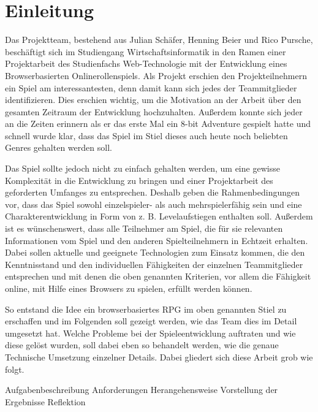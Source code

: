 

\section{Einleitung}

Das Projektteam, bestehend aus Julian Schäfer, Henning Beier und Rico Pursche, beschäftigt sich im Studiengang Wirtschaftsinformatik in den Ramen einer Projektarbeit des Studienfachs Web-Technologie mit der Entwicklung eines Browserbasierten Onlinerollenspiels. 
Als Projekt erschien den Projekteilnehmern ein Spiel am interessantesten, denn damit kann sich jedes der Teammitglieder identifizieren. Dies erschien wichtig, um die Motivation an der Arbeit über den gesamten Zeitraum der Entwicklung hochzuhalten. Außerdem konnte sich jeder an die Zeiten erinnern als er das erste Mal ein 8-bit Adventure gespielt hatte und schnell wurde klar, dass das Spiel im Stiel dieses auch heute noch beliebten Genres gehalten werden soll.

Das Spiel sollte jedoch nicht zu einfach gehalten werden, um eine gewisse Komplexität in die Entwicklung zu bringen und einer Projektarbeit des geforderten Umfanges zu entsprechen. Deshalb geben die Rahmenbedingungen vor, dass das Spiel sowohl einzelspieler- als auch mehrspielerfähig sein und eine Charakterentwicklung in Form von z. B. Levelaufstiegen enthalten soll. Außerdem ist es wünschenswert, dass alle Teilnehmer am Spiel, die für sie relevanten Informationen vom Spiel und den anderen Spielteilnehmern in Echtzeit erhalten. Dabei sollen aktuelle und geeignete Technologien zum Einsatz kommen, die den Kenntnisstand und den individuellen Fähigkeiten der einzelnen Teammitglieder entsprechen und mit denen die oben genannten Kriterien, vor allem die Fähigkeit online, mit Hilfe eines Browsers zu spielen, erfüllt werden können. 

So entstand die Idee ein browserbasiertes RPG im oben genannten Stiel zu erschaffen und im Folgenden soll gezeigt werden, wie das Team dies im Detail umgesetzt hat. Welche Probleme bei der Spieleentwicklung auftraten und wie diese gelöst wurden, soll dabei eben so behandelt werden, wie die genaue Technische Umsetzung einzelner Details. Dabei gliedert sich diese Arbeit grob wie folgt.

Aufgabenbeschreibung
Anforderungen
Herangehensweise
Vorstellung der Ergebnisse
Reflektion

